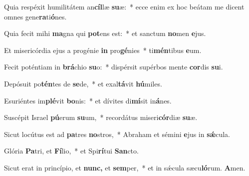 \item Quia respéxit humilitátem an\textbf{cíl}læ \textbf{su}æ:~* ecce enim ex hoc beátam me dicent omnes gene\textbf{ra}ti\textbf{ó}nes.
\item Quia fecit mihi \textbf{ma}gna qui \textbf{pot}ens est:~* et sanctum \textbf{no}men \textbf{e}jus.
\item Et misericórdia ejus a progénie \textbf{in} pro\textbf{gé}nies~* ti\textbf{mén}tibus \textbf{e}um.
\item Fecit poténtiam in \textbf{brá}chio \textbf{su}o:~* dispérsit supérbos mente \textbf{cor}dis \textbf{su}i.
\item Depósuit po\textbf{tén}tes de \textbf{se}de,~* et exal\textbf{tá}vit \textbf{hú}miles.
\item Esuriéntes im\textbf{plé}vit \textbf{bo}nis:~* et dívites di\textbf{mí}sit in\textbf{á}nes.
\item Suscépit Israel \textbf{pú}erum \textbf{su}um,~* recordátus miseri\textbf{cór}diæ \textbf{su}æ.
\item Sicut locútus est ad \textbf{pa}tres \textbf{no}stros,~* Abraham et sémini \textbf{e}jus in \textbf{sǽ}cula.
\item Glória \textbf{Pa}tri, et \textbf{Fí}lio,~* et Spi\textbf{rí}tui \textbf{San}cto.
\item Sicut erat in princípio, et \textbf{nunc,} et \textbf{sem}per,~* et in sǽcula sæcu\textbf{ló}rum. \textbf{A}men.